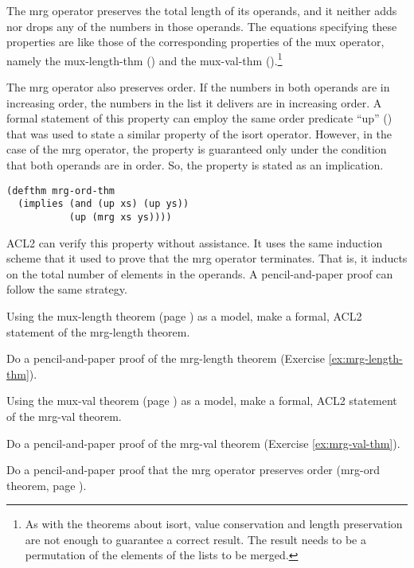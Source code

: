 The mrg operator preserves the total length of its operands,
and it neither adds nor drops any of the numbers in those operands.
The equations specifying these properties are like those of the
corresponding properties of the mux operator, namely
the mux-length-thm (\pageref{mux-length-thm}) and the
mux-val-thm (\pageref{thm:mux-val}).\footnote{As
with the theorems about isort, value conservation
and length preservation are not enough to guarantee
a correct result. The result needs to be a permutation
of the elements of the lists to be merged.}

The mrg operator also preserves order.
If the numbers in both operands are in increasing order,
the numbers in the list it delivers are in increasing order.
A formal statement of this property can employ the same order predicate
``up'' (\pageref{defun:up}) that was used to state a
similar property of the isort operator.
However, in the case of the mrg operator,
the property is guaranteed only under the condition
that both operands are in order.
So, the property is stated as an implication.

\label{defthm:mrg-ord}
\begin{Verbatim}
(defthm mrg-ord-thm
  (implies (and (up xs) (up ys))
           (up (mrg xs ys))))
\end{Verbatim}

ACL2 can verify this property without assistance.
It uses the same induction scheme that it used
to prove that the mrg operator terminates.
That is, it inducts on the total number of elements in the operands.
A pencil-and-paper proof can follow the same strategy.

\begin{ExerciseList}
\Exercise
\label{ex:mrg-length-thm}
Using the mux-length theorem (page \pageref{mux-length-thm})
as a model, make a formal, ACL2 statement of the mrg-length theorem.

\Exercise
Do a pencil-and-paper proof of the mrg-length theorem (Exercise \ref{ex:mrg-length-thm}).

\Exercise
\label{ex:mrg-val-thm}
Using the mux-val theorem (page \pageref{thm:mux-val})
as a model, make a formal, ACL2 statement of the mrg-val theorem.

\Exercise
Do a pencil-and-paper proof of the mrg-val theorem (Exercise \ref{ex:mrg-val-thm}).

\Exercise
Do a pencil-and-paper proof that the mrg operator preserves order
(mrg-ord theorem,  page \pageref{defthm:mrg-ord}).
\end{ExerciseList}

